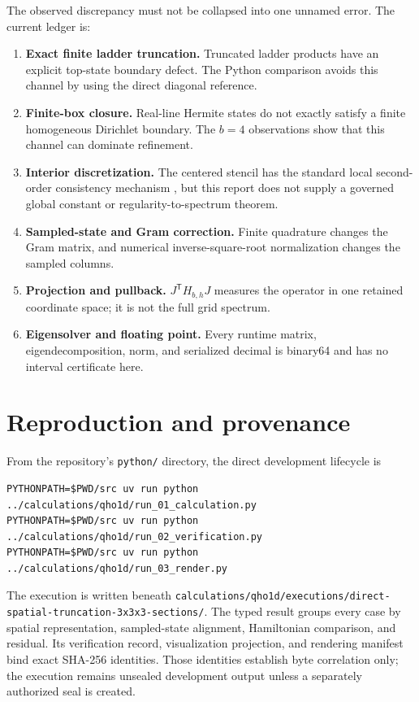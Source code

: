 \documentclass[11pt]{article}
\newcommand{\code}[1]{\texttt{#1}}
\begin{document}
The observed discrepancy must not be collapsed into one unnamed error.  The current
ledger is:
\begin{enumerate}
\item \textbf{Exact finite ladder truncation.} Truncated ladder products have an
explicit top-state boundary defect.  The Python comparison avoids this channel by
using the direct diagonal reference.
\item \textbf{Finite-box closure.} Real-line Hermite states do not exactly satisfy a
finite homogeneous Dirichlet boundary.  The $b=4$ observations show that this channel
can dominate refinement.
\item \textbf{Interior discretization.} The centered stencil has the standard local
second-order consistency mechanism \cite{strikwerda2004}, but this report does not
supply a governed global
constant or regularity-to-spectrum theorem.
\item \textbf{Sampled-state and Gram correction.} Finite quadrature changes the Gram
matrix, and numerical inverse-square-root normalization changes the sampled columns.
\item \textbf{Projection and pullback.} $J^{\mathsf T}H_{b,h}J$ measures the operator
in one retained coordinate space; it is not the full grid spectrum.
\item \textbf{Eigensolver and floating point.} Every runtime matrix, eigendecomposition,
norm, and serialized decimal is binary64 and has no interval certificate here.
\end{enumerate}

\section{Reproduction and provenance}

From the repository's \code{python/} directory, the direct development lifecycle is
\begin{verbatim}
PYTHONPATH=$PWD/src uv run python ../calculations/qho1d/run_01_calculation.py
PYTHONPATH=$PWD/src uv run python ../calculations/qho1d/run_02_verification.py
PYTHONPATH=$PWD/src uv run python ../calculations/qho1d/run_03_render.py
\end{verbatim}
The execution is written beneath
\code{calculations/qho1d/executions/direct-spatial-truncation-3x3x3-sections/}.  The
typed result groups every case by spatial representation, sampled-state alignment,
Hamiltonian comparison, and residual.  Its verification record, visualization
projection, and rendering manifest bind
exact SHA-256 identities.  Those identities establish byte correlation only; the
execution remains unsealed development output unless a separately authorized seal is
created.
\end{document}
